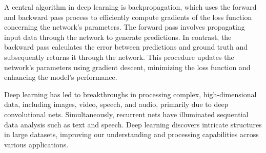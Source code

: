 A central algorithm in deep learning is backpropagation, which uses the forward and backward pass process to efficiently compute gradients of the loss function concerning the network's parameters. The forward pass involves propagating input data through the network to generate predictions. In contrast, the backward pass calculates the error between predictions and ground truth and subsequently returns it through the network. This procedure updates the network's parameters using gradient descent, minimizing the loss function and enhancing the model's performance.

Deep learning has led to breakthroughs in processing complex, high-dimensional data, including images, video, speech, and audio, primarily due to deep convolutional nets. Simultaneously, recurrent nets have illuminated sequential data analysis such as text and speech. Deep learning discovers intricate structures in large datasets, improving our understanding and processing capabilities across various applications.



\newpage


